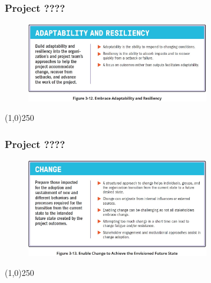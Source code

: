 \begin{frame}
\frametitle{Project ????}
 \begin{figure}
    \centering
        \includegraphics[width = 8cm]{../images/standard/Fig3-12.jpg}
    \label{standardfig:3-12}
 \end{figure}
\end{frame}
\begin{center}\line(1,0){250}\end{center}

\begin{frame}
\frametitle{Project ????}
 \begin{figure}
    \centering
        \includegraphics[width = 8cm]{../images/standard/Fig3-13.jpg}
    \label{standardfig:3-13}
 \end{figure}
\end{frame}
\begin{center}\line(1,0){250}\end{center}





